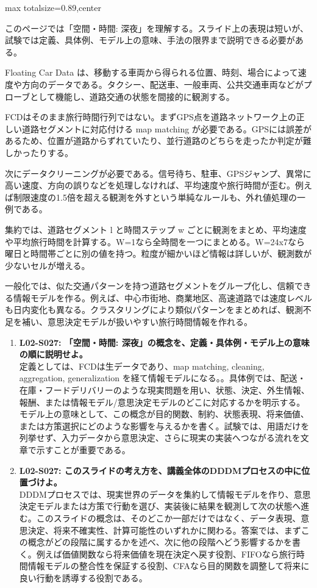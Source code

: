 \begin{minipage}[t]{0.58\textwidth}
\begin{adjustbox}{max totalsize={\textwidth}{0.89\textheight},center}
\begin{minipage}{\textwidth}\scriptsize
{}このページでは「空間・時間: 深夜」を理解する。スライド上の表現は短いが、試験では定義、具体例、モデル上の意味、手法の限界まで説明できる必要がある。\par
Floating Car Data は、移動する車両から得られる位置、時刻、場合によって速度や方向のデータである。タクシー、配送車、一般車両、公共交通車両などがプローブとして機能し、道路交通の状態を間接的に観測する。\par
FCDはそのまま旅行時間行列ではない。まずGPS点を道路ネットワーク上の正しい道路セグメントに対応付ける map matching が必要である。GPSには誤差があるため、位置が道路からずれていたり、並行道路のどちらを走ったか判定が難しかったりする。\par
次にデータクリーニングが必要である。信号待ち、駐車、GPSジャンプ、異常に高い速度、方向の誤りなどを処理しなければ、平均速度や旅行時間が歪む。例えば制限速度の1.5倍を超える観測を外すという単純なルールも、外れ値処理の一例である。\par
集約では、道路セグメント l と時間ステップ w ごとに観測をまとめ、平均速度や平均旅行時間を計算する。W=1なら全時間を一つにまとめる。W=24x7なら曜日と時間帯ごとに別の値を持つ。粒度が細かいほど情報は詳しいが、観測数が少ないセルが増える。\par
一般化では、似た交通パターンを持つ道路セグメントをグループ化し、信頼できる情報モデルを作る。例えば、中心市街地、商業地区、高速道路では速度レベルも日内変化も異なる。クラスタリングにより類似パターンをまとめれば、観測不足を補い、意思決定モデルが扱いやすい旅行時間情報を作れる。\par{}\begin{enumerate}\item \textbf{L02-S027: 「空間・時間: 深夜」の概念を、定義・具体例・モデル上の意味の順に説明せよ。}\\定義としては、FCDは生データであり、map matching, cleaning, aggregation, generalization を経て情報モデルになる。。具体例では、配送・在庫・フードデリバリーのような現実問題を用い、状態、決定、外生情報、報酬、または情報モデル/意思決定モデルのどこに対応するかを明示する。モデル上の意味として、この概念が目的関数、制約、状態表現、将来価値、または方策選択にどのような影響を与えるかを書く。試験では、用語だけを列挙せず、入力データから意思決定、さらに現実の実装へつながる流れを文章で示すことが重要である。\item \textbf{L02-S027: このスライドの考え方を、講義全体のDDDMプロセスの中に位置づけよ。}\\DDDMプロセスでは、現実世界のデータを集約して情報モデルを作り、意思決定モデルまたは方策で行動を選び、実装後に結果を観測して次の状態へ進む。このスライドの概念は、そのどこか一部だけではなく、データ表現、意思決定、将来不確実性、計算可能性のいずれかに関わる。答案では、まずこの概念がどの段階に属するかを述べ、次に他の段階へどう影響するかを書く。例えば価値関数なら将来価値を現在決定へ戻す役割、FIFOなら旅行時間情報モデルの整合性を保証する役割、CFAなら目的関数を調整して将来に良い行動を誘導する役割である。\end{enumerate}

\end{minipage}
\end{adjustbox}
\end{minipage}

